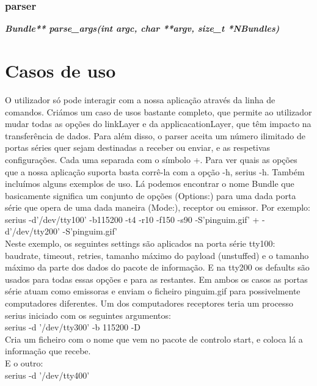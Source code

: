 \documentclass[a4paper]{article}
\begin{document}
\subsubsection{parser}

\noindent\textbf{\textit{Bundle** parse\_args(int argc, char **argv, size\_t *NBundles)}}\\

\section{Casos de uso}
O utilizador só pode interagir com a nossa aplicação através da linha de
comandos. Criámos um caso de usos bastante completo, que permite ao utilizador
mudar todas as opções do linkLayer e da applicacationLayer, que têm impacto na
transferência de dados. Para além disso, o parser aceita um número ilimitado de
portas séries quer sejam destinadas a receber ou enviar, e as respetivas
configurações. Cada uma separada com o símbolo +. Para ver quais as opções que
a nossa aplicação suporta basta corrê-la com a opção -h, serius -h. Também
incluímos alguns exemplos de uso. Lá podemos encontrar o nome Bundle que
basicamente significa um conjunto de opções (Options:) para uma dada porta
série que opera de uma dada maneira (Mode:), receptor ou emissor. Por
exemplo:\\\newline serius -d'/dev/tty100' -b115200 -t4 -r10 -f150 -s90
-S'pinguim.gif' + -d'/dev/tty200' -S'pinguim.gif'\\\newline Neste exemplo, os
seguintes settings são aplicados na porta série tty100: baudrate, timeout,
retries, tamanho máximo do payload (unstuffed) e o tamanho máximo da parte dos
dados do pacote de informação. E na tty200 os defaults são usados para todas
essas opções e para as restantes. Em ambos os casos as portas série atuam como
emissoras e enviam o ficheiro pinguim.gif para possivelmente computadores
diferentes. Um dos computadores receptores teria um processo serius iniciado
com os seguintes argumentos:\\\newline serius -d '/dev/tty300' -b 115200 -D\\
Cria um ficheiro com o nome que vem no pacote de controlo start, e coloca lá a
informação que recebe. \\\newline E o outro:\\\newline serius -d '/dev/tty400'
\end{document}
